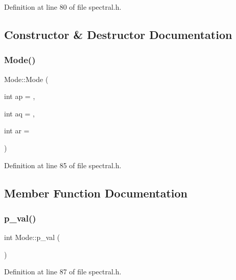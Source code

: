 Definition at line 80 of file spectral.\+h.



\subsection{Constructor \& Destructor Documentation}
\mbox{\label{classMode_a070566cdb8712b0bfdf6f775bc23be6b}} 
\subsubsection{\texorpdfstring{Mode()}{Mode()}}
{\footnotesize\ttfamily Mode\+::\+Mode (\begin{DoxyParamCaption}\item[{int}]{ap = {},  }\item[{int}]{aq = {},  }\item[{int}]{ar = {} }\end{DoxyParamCaption})\hspace{0.3cm}{\ttfamily [inline]}}



Definition at line 85 of file spectral.\+h.



\subsection{Member Function Documentation}
\mbox{\label{classMode_adb05ad8eecd616f8d68de8bff4de78d1}} 
\subsubsection{\texorpdfstring{p\+\_\+val()}{p\_val()}}
{\footnotesize\ttfamily int Mode\+::p\+\_\+val (\begin{DoxyParamCaption}{ }\end{DoxyParamCaption})\hspace{0.3cm}{\ttfamily [inline]}}



Definition at line 87 of file spectral.\+h.



